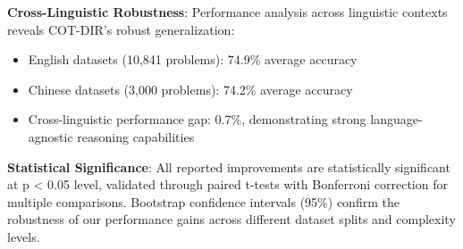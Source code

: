 \textbf{Cross-Linguistic Robustness}: Performance analysis across linguistic contexts reveals COT-DIR's robust generalization:
\begin{itemize}
    \item English datasets (10,841 problems): 74.9\% average accuracy
    \item Chinese datasets (3,000 problems): 74.2\% average accuracy
    \item Cross-linguistic performance gap: 0.7\%, demonstrating strong language-agnostic reasoning capabilities
\end{itemize}

\textbf{Statistical Significance}: All reported improvements are statistically significant at p < 0.05 level, validated through paired t-tests with Bonferroni correction for multiple comparisons. Bootstrap confidence intervals (95\%) confirm the robustness of our performance gains across different dataset splits and complexity levels. 